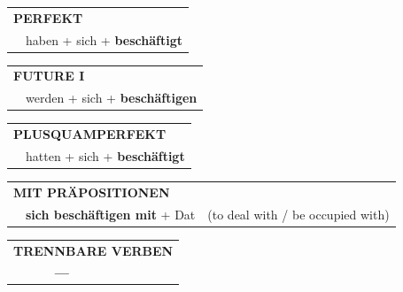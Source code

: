 \begin{verbentry}
    \vspace{10pt}

 \begin{tabular}{rl}
     \multicolumn{2}{l}{\textbf{PERFEKT}}\\
   & haben + sich + \textbf{beschäftigt}\\
  \end{tabular}
\hfill
   \begin{tabular}{rl}
    \multicolumn{2}{l}{\textbf{FUTURE I} }\\
   & werden + sich + \textbf{beschäftigen}\\
  \end{tabular}
\hfill
   \begin{tabular}{rl}
      \multicolumn{2}{l}{\textbf{PLUSQUAMPERFEKT}}\\
   & hatten + sich + \textbf{beschäftigt}\\
  \end{tabular}

   \vspace{10pt}

   \begin{tabular}{lll}
      \multicolumn{3}{l}{\textbf{MIT PRÄPOSITIONEN}}\\
& \textbf{sich beschäftigen mit} + Dat & (to deal with / be occupied with)\\
\end{tabular}
  \hfill
   \begin{tabular}{lll}
\multicolumn{3}{l}{\textbf{TRENNBARE VERBEN}}\\
& \textbf{---} & \\
\end{tabular}

  \vspace{-5pt}
\end{verbentry}

